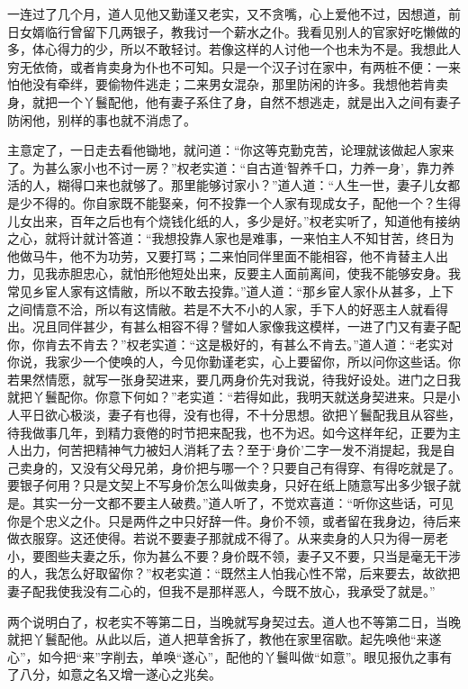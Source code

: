 \documentclass[a4paper,12pt,UTF8,twoside]{ctexbook}
\begin{document}
一连过了几个月，道人见他又勤谨又老实，又不贪嘴，心上爱他不过，因想道，前日女婿临行曾留下几两银子，教我讨一个薪水之仆。我看见别人的官家好吃懒做的多，体心得力的少，所以不敢轻讨。若像这样的人讨他一个也未为不是。我想此人穷无依倚，或者肯卖身为仆也不可知。只是一个汉子讨在家中，有两桩不便：一来怕他没有牵绊，要偷物件逃走；二来男女混杂，那里防闲的许多。我想他若肯卖身，就把一个丫鬟配他，他有妻子系住了身，自然不想逃走，就是出入之间有妻子防闲他，别样的事也就不消虑了。

主意定了，一日走去看他锄地，就问道：“你这等克勤克苦，论理就该做起人家来了。为甚么家小也不讨一房？”权老实道：“自古道‘智养千口，力养一身’，靠力养活的人，糊得口来也就够了。那里能够讨家小？”道人道：“人生一世，妻子儿女都是少不得的。你自家既不能娶亲，何不投靠一个人家有现成女子，配他一个？生得儿女出来，百年之后也有个烧钱化纸的人，多少是好。”权老实听了，知道他有接纳之心，就将计就计答道：“我想投靠人家也是难事，一来怕主人不知甘苦，终日为他做马牛，他不为功劳，又要打骂；二来怕同伴里面不能相容，他不肯替主人出力，见我赤胆忠心，就怕形他短处出来，反要主人面前离间，使我不能够安身。我常见乡宦人家有这情敝，所以不敢去投靠。”道人道：“那乡宦人家仆从甚多，上下之间情意不洽，所以有这情敝。若是不大不小的人家，手下人的好恶主人就看得出。况且同伴甚少，有甚么相容不得？譬如人家像我这模样，一进了门又有妻子配你，你肯去不肯去？”权老实道：“这是极好的，有甚么不肯去。”道人道：“老实对你说，我家少一个使唤的人，今见你勤谨老实，心上要留你，所以问你这些话。你若果然情愿，就写一张身契进来，要几两身价先对我说，待我好设处。进门之日我就把丫鬟配你。你意下何如？”老实道：“若得如此，我明天就送身契进来。只是小人平日欲心极淡，妻子有也得，没有也得，不十分思想。欲把丫鬟配我且从容些，待我做事几年，到精力衰倦的时节把来配我，也不为迟。如今这样年纪，正要为主人出力，何苦把精神气力被妇人消耗了去？至于‘身价’二字一发不消提起，我是自己卖身的，又没有父母兄弟，身价把与哪一个？只要自己有得穿、有得吃就是了。要银子何用？只是文契上不写身价怎么叫做卖身，只好在纸上随意写出多少银子就是。其实一分一文都不要主人破费。”道人听了，不觉欢喜道：“听你这些话，可见你是个忠义之仆。只是两件之中只好辞一件。身价不领，或者留在我身边，待后来做衣服穿。这还使得。若说不要妻子那就成不得了。从来卖身的人只为得一房老小，要图些夫妻之乐，你为甚么不要？身价既不领，妻子又不要，只当是毫无干涉的人，我怎么好取留你？”权老实道：“既然主人怕我心性不常，后来要去，故欲把妻子配我使我没有二心的，但我不是那样恶人，今既不放心，我承受了就是。”

两个说明白了，权老实不等第二日，当晚就写身契过去。道人也不等第二日，当晚就把丫鬟配他。从此以后，道人把草舍拆了，教他在家里宿歇。起先唤他“来遂心”，如今把“来”字削去，单唤“遂心”，配他的丫鬟叫做“如意”。眼见报仇之事有了八分，如意之名又增一遂心之兆矣。
\end{document}
